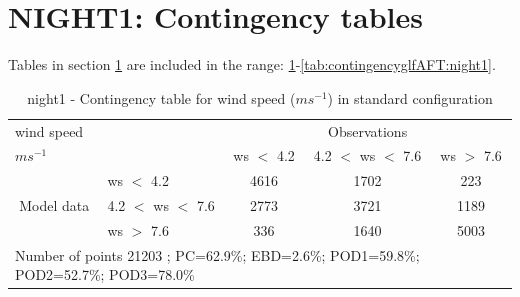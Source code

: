 \section{NIGHT1: Contingency tables}\label{sec:night1:cont}
Tables in section \ref{sec:night1:cont} are included in the range: \ref{tab:contingencywsBEF:night1}-\ref{tab:contingencyglfAFT:night1}.
\begin{table}[h!]
\begin{center}
\begin{tabular}{llccc}
\hline
{wind speed}                                       &                                                    & \multicolumn{3}{c}{Observations}                 \\
{$m s^{-1}$}                                       &                             & ws $<$ 4.2   & 4.2 $<$ ws $<$ 7.6 & ws $>$ 7.6 \\
\hline
\multicolumn{1}{c}{\multirow{3}{*}{Model data}}  & ws $<$ 4.2             & 4616                & 1702                       & 223              \\
                                                 & 4.2  $<$ ws $<$ 7.6 & 2773                & 3721                       & 1189              \\
                                                 & ws $>$ 7.6             & 336                & 1640                       & 5003              \\
\hline 
\multicolumn{5}{l}{ Number of points        21203 ; PC=62.9\%; EBD=2.6\%; POD1=59.8\%; POD2=52.7\%; POD3=78.0\%}                 \\
\end{tabular}
\end{center}
\caption{night1 - Contingency table for {wind speed} ($m s^{-1}$) in standard configuration}
\label{tab:contingencywsBEF:night1}
\end{table}
